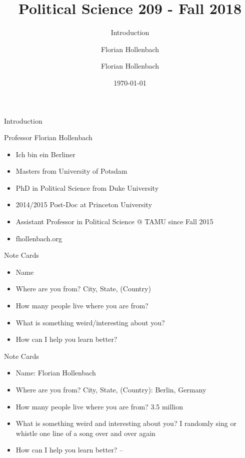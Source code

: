 \documentclass[presentation]{beamer}
\author{Florian Hollenbach}
\author{Florian Hollenbach}
\date{\today}
\title{Political Science 209 - Fall 2018}
\subtitle{Introduction}
\begin{document}
\maketitle


\begin{frame}[label={sec:org701effc}]{Introduction}
\begin{block}{Professor Florian Hollenbach}
\begin{itemize}
\item Ich bin ein Berliner
\item Masters from University of Potsdam
\item PhD in Political Science from Duke University
\item 2014/2015 Post-Doc at Princeton University
\item Assistant Professor in Political Science @ TAMU since Fall 2015
\item fhollenbach.org
\end{itemize}
\end{block}
\end{frame}


\begin{frame}[label={sec:orgd86d59f}]{Note Cards}
\begin{itemize}
\item Name

\item Where are you from? City, State, (Country)

\item How many people live where you are from?

\item What is something weird/interesting about you?

\item How can I help you learn better?
\end{itemize}
\end{frame}

\begin{frame}[label={sec:org0498c82}]{Note Cards}
\begin{itemize}
\item Name: Florian Hollenbach

\item Where are you from? City, State, (Country): Berlin, Germany

\item How many people live where you are from? 3.5 million

\item What is something weird and interesting about you? I randomly sing or whistle one line of a song over and over again

\item How can I help you learn better?  --
\end{itemize}
\end{frame}
\end{document}
